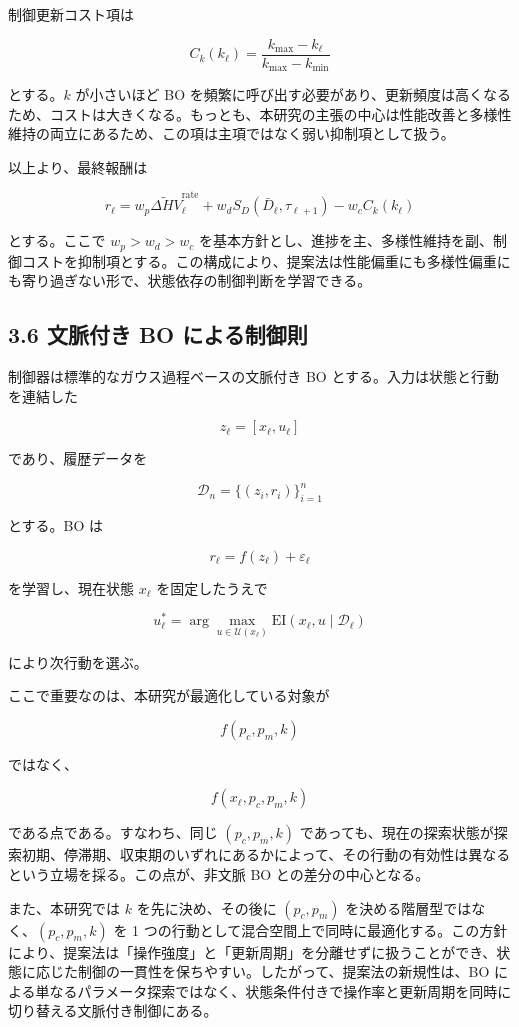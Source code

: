 制御更新コスト項は

\[
C_k(k_\ell)
=
\frac{k_{\max} - k_\ell}{k_{\max} - k_{\min}}
\]

とする。$k$ が小さいほど BO を頻繁に呼び出す必要があり、更新頻度は高くなるため、コストは大きくなる。もっとも、本研究の主張の中心は性能改善と多様性維持の両立にあるため、この項は主項ではなく弱い抑制項として扱う。

以上より、最終報酬は

\[
r_\ell
=
w_p \widetilde{\Delta HV}^{\mathrm{rate}}_\ell
+
w_d S_D(\bar{D}_\ell,\tau_{\ell+1})
-
w_c C_k(k_\ell)
\]

とする。ここで $w_p > w_d > w_c$ を基本方針とし、進捗を主、多様性維持を副、制御コストを抑制項とする。この構成により、提案法は性能偏重にも多様性偏重にも寄り過ぎない形で、状態依存の制御判断を学習できる。

\subsection{3.6 文脈付き BO による制御則}


制御器は標準的なガウス過程ベースの文脈付き BO とする。入力は状態と行動を連結した

\[
z_\ell = [x_\ell, u_\ell]
\]

であり、履歴データを

\[
\mathcal{D}_n = \{(z_i, r_i)\}_{i=1}^{n}
\]

とする。BO は

\[
r_\ell = f(z_\ell) + \varepsilon_\ell
\]

を学習し、現在状態 $x_\ell$ を固定したうえで

\[
u_\ell^\ast
=
\arg\max_{u \in \mathcal{U}(x_\ell)}
\mathrm{EI}(x_\ell, u \mid \mathcal{D}_\ell)
\]

により次行動を選ぶ。

ここで重要なのは、本研究が最適化している対象が

\[
f(p_c,p_m,k)
\]

ではなく、

\[
f(x_\ell,p_c,p_m,k)
\]

である点である。すなわち、同じ $(p_c,p_m,k)$ であっても、現在の探索状態が探索初期、停滞期、収束期のいずれにあるかによって、その行動の有効性は異なるという立場を採る。この点が、非文脈 BO との差分の中心となる。

また、本研究では $k$ を先に決め、その後に $(p_c,p_m)$ を決める階層型ではなく、$(p_c,p_m,k)$ を 1 つの行動として混合空間上で同時に最適化する。この方針により、提案法は「操作強度」と「更新周期」を分離せずに扱うことができ、状態に応じた制御の一貫性を保ちやすい。したがって、提案法の新規性は、BO による単なるパラメータ探索ではなく、状態条件付きで操作率と更新周期を同時に切り替える文脈付き制御にある。

